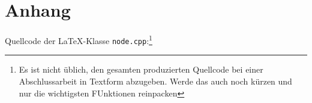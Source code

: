 \section{Anhang}

Quellcode der \LaTeX-Klasse \texttt{node.cpp}:\footnote{Es ist nicht üblich,
den gesamten produzierten Quellcode bei einer Abschlussarbeit in Textform
abzugeben. Werde das auch noch kürzen und nur die wichtigsten FUnktionen reinpacken}


